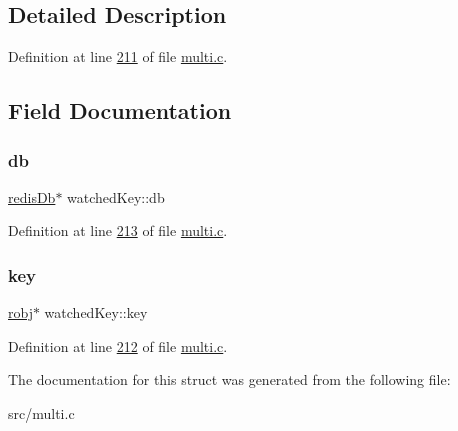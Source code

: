 \subsection{Detailed Description}


Definition at line \hyperlink{multi_8c_source_l00211}{211} of file \hyperlink{multi_8c_source}{multi.\+c}.



\subsection{Field Documentation}
\mbox{\label{structwatchedKey_a10a35ac40a4c595671089ad304a03695}} 
\subsubsection{\texorpdfstring{db}{db}}
{\footnotesize\ttfamily \hyperlink{structredisDb}{redis\+Db}$\ast$ watched\+Key\+::db}



Definition at line \hyperlink{multi_8c_source_l00213}{213} of file \hyperlink{multi_8c_source}{multi.\+c}.

\mbox{\label{structwatchedKey_aeafb4ff00bb0d53a76e8c9c52571b6ec}} 
\subsubsection{\texorpdfstring{key}{key}}
{\footnotesize\ttfamily \hyperlink{structredisObject}{robj}$\ast$ watched\+Key\+::key}



Definition at line \hyperlink{multi_8c_source_l00212}{212} of file \hyperlink{multi_8c_source}{multi.\+c}.



The documentation for this struct was generated from the following file\+:\begin{DoxyCompactItemize}
\item 
src/multi.\+c\end{DoxyCompactItemize}
